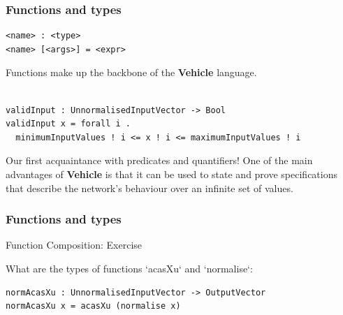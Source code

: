 \documentclass[t,compress,aspectratio=169]{beamer}
\begin{document}
\begin{frame}[fragile]
\frametitle{Functions and types}
\begin{verbatim}
<name> : <type>
<name> [<args>] = <expr>

\end{verbatim}
Functions make up the backbone of the \textbf{Vehicle} language.
\pause
\begin{verbatim}

validInput : UnnormalisedInputVector -> Bool
validInput x = forall i .
  minimumInputValues ! i <= x ! i <= maximumInputValues ! i

\end{verbatim}

\pause

\begin{block}{Our first acquaintance with predicates and quantifiers!}
 One of the main advantages of \textbf{Vehicle} is that it can be used to state and prove specifications that describe the network’s behaviour over an infinite set of values.
\end{block}

\end{frame}



\begin{frame}[fragile]
\frametitle{Functions and types}

\begin{block}{Function Composition: Exercise}

What are the types of functions `acasXu`  and `normalise`:

\begin{verbatim}
normAcasXu : UnnormalisedInputVector -> OutputVector
normAcasXu x = acasXu (normalise x)
\end{verbatim}
\end{block}

\end{frame}


\end{document}
